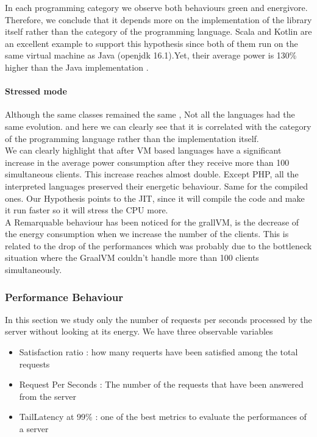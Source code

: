 In each programming category we observe both behaviours green and energivore. Therefore, we conclude that it depends more on the implementation of the library itself rather than the category of the programming language. Scala and Kotlin are an excellent example to support this hypothesis since both of them run on the same virtual machine as Java (openjdk 16.1).Yet, their average power is 130\% higher than the Java implementation .

\paragraph{Stressed mode}
Although the same classes remained the same , Not all the languages had the same evolution. and here we can clearly see that it is correlated with the category of the programming language rather than the implementation itself.\\
We can clearly highlight that after VM based languages have a significant increase in the average power consumption after they receive more than 100 simultaneous clients. This increase reaches almost double.
Except PHP, all the interpreted languages preserved their energetic behaviour. Same for the compiled ones.
Our Hypothesis points to the JIT, since it will compile the code and make it run faster so it will stress the CPU more.\\
A Remarquable behaviour has been noticed for the grallVM, is the decrease of the energy consumption when we increase the number of the clients. This is related to the drop of the performances which was probably due to the bottleneck situation where the GraalVM couldn't handle more than 100 clients simultaneously.

\subsubsection{Performance Behaviour}
In this section we study only the number of requests per seconds processed by the server without looking at its energy.
We have three observable variables
\begin{itemize}
    \item Satisfaction ratio : how many requerts have been satisfied among the total requests
    \item Request Per Seconds : The number of the requests that have been answered from the server
    \item TailLatency at 99\% : one of the best metrics to evaluate the performances of a server
\end{itemize}

